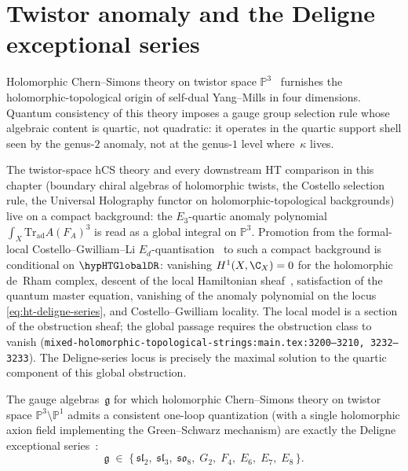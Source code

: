 \section{Twistor anomaly and the Deligne exceptional series}
\label{sec:ht-twistor-deligne}

Holomorphic Chern--Simons theory on twistor space
$\mathbb{P}^3$~\cite{Costello2111} furnishes the
holomorphic-topological origin of self-dual Yang--Mills in four
dimensions. Quantum consistency of this theory imposes a gauge
group selection rule whose algebraic content is quartic, not
quadratic: it operates in the quartic support shell seen by the
genus-$2$ anomaly, not at the genus-$1$ level where~$\kappa$ lives.

\begin{remark}
\label{rem:ht-global-de-rham-holomorphic-topological}
The twistor-space hCS theory and every downstream HT comparison in
this chapter (boundary chiral algebras of holomorphic twists, the
Costello selection rule, the Universal Holography functor on
holomorphic-topological backgrounds) live on a compact background:
the $E_3$-quartic anomaly polynomial $\int_X
\mathrm{Tr}_{\mathrm{ad}} A(F_A)^3$ is read as a global integral on
$\mathbb{P}^3$. Promotion from the formal-local Costello--Gwilliam--Li
$E_d$-quantisation~\cite{CG17} to such a compact background is
conditional on $\hypHTGlobalDR$: vanishing $H^1(X,\C_X) = 0$ for the
holomorphic de~Rham complex, descent of the local Hamiltonian
sheaf~\cite[\S4--5]{CG17}, satisfaction of the quantum master
equation, vanishing of the anomaly polynomial on the locus
\eqref{eq:ht-deligne-series}, and Costello--Gwilliam locality. The
local model is a section of the obstruction sheaf; the global
passage requires the obstruction class to vanish
(\texttt{mixed-holomorphic-topological-strings:main.tex:3200--3210,
3232--3233}). The Deligne-series locus is precisely the maximal
solution to the quartic component of this global obstruction.
\end{remark}

\begin{proposition}
\label{prop:ht-twistor-deligne}
The gauge algebras~$\mathfrak{g}$ for which holomorphic
Chern--Simons theory on twistor space
$\mathbb{P}^3 \setminus \mathbb{P}^1$ admits a consistent
one-loop quantization \textup{(}with a single holomorphic axion
field implementing the Green--Schwarz
mechanism\textup{)}
are exactly the Deligne exceptional
series~\cite{Deligne96, Cvitanovic08}:
\begin{equation}\label{eq:ht-deligne-series}
\mathfrak{g} \;\in\;
\bigl\{\,
 \mathfrak{sl}_2,\;
 \mathfrak{sl}_3,\;
 \mathfrak{so}_8,\;
 G_2,\;
 F_4,\;
 E_6,\;
 E_7,\;
 E_8
\,\bigr\}.
\end{equation}
\end{proposition}

